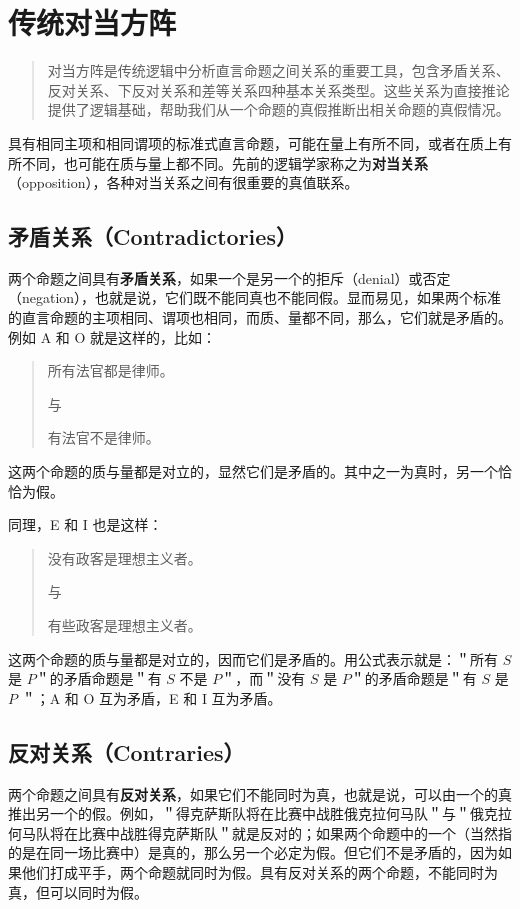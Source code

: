 \section{传统对当方阵}

\begin{quotation}
对当方阵是传统逻辑中分析直言命题之间关系的重要工具，包含矛盾关系、反对关系、下反对关系和差等关系四种基本关系类型。这些关系为直接推论提供了逻辑基础，帮助我们从一个命题的真假推断出相关命题的真假情况。
\end{quotation}

具有相同主项和相同谓项的标准式直言命题，可能在量上有所不同，或者在质上有所不同，也可能在质与量上都不同。先前的逻辑学家称之为\textbf{对当关系}（opposition），各种对当关系之间有很重要的真值联系。

\subsection{矛盾关系（Contradictories）}
两个命题之间具有\textbf{矛盾关系}，如果一个是另一个的拒斥（denial）或否定（negation），也就是说，它们既不能同真也不能同假。显而易见，如果两个标准的直言命题的主项相同、谓项也相同，而质、量都不同，那么，它们就是矛盾的。例如 A 和 O 就是这样的，比如：

\begin{quote}
所有法官都是律师。

与

有法官不是律师。
\end{quote}

这两个命题的质与量都是对立的，显然它们是矛盾的。其中之一为真时，另一个恰恰为假。

同理，E 和 I 也是这样：

\begin{quote}
没有政客是理想主义者。

与

有些政客是理想主义者。
\end{quote}

这两个命题的质与量都是对立的，因而它们是矛盾的。用公式表示就是：＂所有 $S$ 是 $P$＂的矛盾命题是＂有 $S$ 不是 $P$＂，而＂没有 $S$ 是 $P$＂的矛盾命题是＂有 $S$ 是 $P$ ＂；A 和 O 互为矛盾，E 和 I 互为矛盾。

\subsection{反对关系（Contraries）}
两个命题之间具有\textbf{反对关系}，如果它们不能同时为真，也就是说，可以由一个的真推出另一个的假。例如，＂得克萨斯队将在比赛中战胜俄克拉何马队＂与＂俄克拉何马队将在比赛中战胜得克萨斯队＂就是反对的；如果两个命题中的一个（当然指的是在同一场比赛中）是真的，那么另一个必定为假。但它们不是矛盾的，因为如果他们打成平手，两个命题就同时为假。具有反对关系的两个命题，不能同时为真，但可以同时为假。

